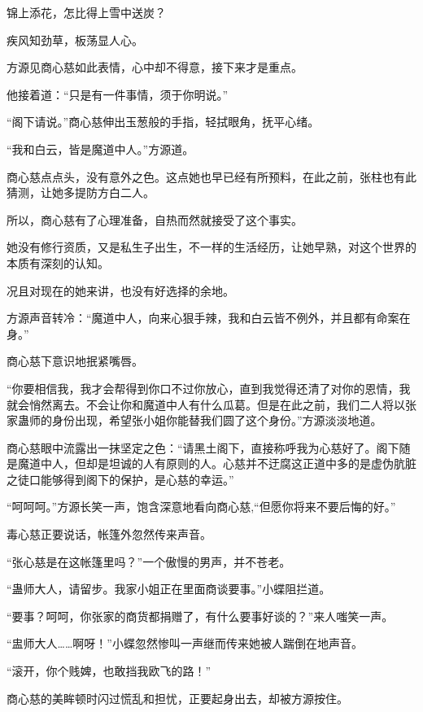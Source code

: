 
\begin{this_body}



锦上添花，怎比得上雪中送炭？

疾风知劲草，板荡显人心。

方源见商心慈如此表情，心中却不得意，接下来才是重点。

他接着道：“只是有一件事情，须于你明说。”

“阁下请说。”商心慈伸出玉葱般的手指，轻拭眼角，抚平心绪。

“我和白云，皆是魔道中人。”方源道。

商心慈点点头，没有意外之色。这点她也早已经有所预料，在此之前，张柱也有此猜测，让她多提防方白二人。

所以，商心慈有了心理准备，自热而然就接受了这个事实。

她没有修行资质，又是私生子出生，不一样的生活经历，让她早熟，对这个世界的本质有深刻的认知。

况且对现在的她来讲，也没有好选择的余地。

方源声音转冷：“魔道中人，向来心狠手辣，我和白云皆不例外，并且都有命案在身。”

商心慈下意识地抿紧嘴唇。

“你要相信我，我才会帮得到你口不过你放心，直到我觉得还清了对你的恩情，我就会悄然离去。不会让你和魔道中人有什么瓜葛。但是在此之前，我们二人将以张家蛊师的身份出现，希望张小姐你能替我们圆了这个身份。”方源淡淡地道。

商心慈眼中流露出一抹坚定之色：“请黑土阁下，直接称呼我为心慈好了。阁下随是魔道中人，但却是坦诚的人有原则的人。心慈并不迂腐这正道中多的是虚伪肮脏之徒口能够得到阁下的保护，是心慈的幸运。”

“呵呵呵。”方源长笑一声，饱含深意地看向商心慈,“但愿你将来不要后悔的好。”

毒心慈正要说话，帐篷外忽然传来声音。

“张心慈是在这帐篷里吗？”一个傲慢的男声，并不苍老。

“蛊师大人，请留步。我家小姐正在里面商谈要事。”小蝶阻拦道。

“要事？呵呵，你张家的商货都捐赠了，有什么要事好谈的？”来人嗤笑一声。

“盅师大人……啊呀！”小蝶忽然惨叫一声继而传来她被人踹倒在地声音。

“滚开，你个贱婢，也敢挡我欧飞的路！”

商心慈的美眸顿时闪过慌乱和担忧，正要起身出去，却被方源按住。


\end{this_body}
